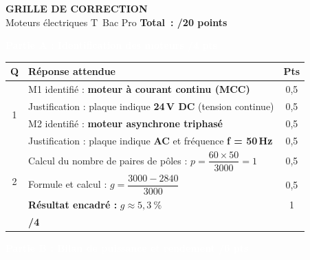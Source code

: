 \documentclass[10pt,a4paper]{article}
\newcommand{\exotitle}[2]{%
  \noindent\colorbox{exoheader}{%
    \parbox{\dimexpr\linewidth-2\fboxsep\relax}{%
      \textcolor{white}{\textbf{\large #1 \hfill #2}}%
    }%
  }%
}
\begin{document}
\begin{center}
  {\LARGE\textbf{GRILLE DE CORRECTION}}\\[1mm]
  {\large Moteurs électriques \hspace{1cm} T~Bac Pro \hspace{1cm} \textbf{Total~: /20 points}}
\end{center}

\vspace{3mm}

\exotitle{Partie A : Identification des moteurs}{/4 pts}

\vspace{1mm}

\begin{tabularx}{\linewidth}{|c|X|c|}
  \hline
  \rowcolor{exolight}
  \textbf{Q} & \textbf{Réponse attendue} & \textbf{Pts} \\
  \hline
  \multirow{4}{*}{1} & M1 identifié : \textbf{moteur à courant continu (MCC)} & 0,5 \\
  \cline{2-3}
  & Justification : plaque indique \textbf{24\,V DC} (tension continue) & 0,5 \\
  \cline{2-3}
  & M2 identifié : \textbf{moteur asynchrone triphasé} & 0,5 \\
  \cline{2-3}
  & Justification : plaque indique \textbf{AC} et fréquence \textbf{f = 50\,Hz} & 0,5 \\
  \hline
  \multirow{3}{*}{2} & Calcul du nombre de paires de pôles : $p = \dfrac{60 \times 50}{3000} = 1$ & 0,5 \\
  \cline{2-3}
  & Formule et calcul : $g = \dfrac{3000 - 2840}{3000}$ & 0,5 \\
  \cline{2-3}
  & \textbf{Résultat encadré :} $g \approx 5{,}3~\%$ & 1 \\
  \hline
  \rowcolor{totalrow}
  \multicolumn{2}{|r|}{\textbf{Sous-total Partie A}} & \textbf{/4} \\
  \hline
\end{tabularx}

\vspace{3mm}

\exotitle{Partie B : Bilan de puissance et rendement}{/6 pts}

\vspace{1mm}
\end{document}
